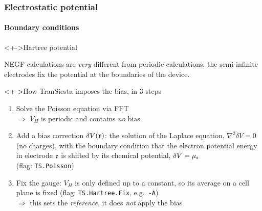 \begin{frame}
{\begin{center}

  \end{center}}

\end{frame}


\begin{frame}
  \frametitle{Electrostatic potential}
  \framesubtitle{Boundary conditions}

  \begin{block}<+->{Hartree potential}

    NEGF calculations are \emph{very} different from periodic calculations: the
    semi-infinite electrodes fix the potential at the boundaries of the device.

  \end{block}

  \begin{block}<+->{How TranSiesta imposes the bias, in 3 steps}

    \begin{enumerate}[<+->]
      \item Solve the Poisson equation via FFT\\
      $\Rightarrow$ $V_H$ is periodic and contains \emph{no} bias

      \item Add a bias correction $\delta V(\mathbf{r})$: the solution of the Laplace equation,
      $\nabla^2\delta V=0$ (no charges), with the boundary condition that the electron
      potential energy in electrode $\mathfrak{e}$ is shifted by its chemical potential,
      $\delta V = \mu_{\mathfrak{e}}$\\
      (flag: \texttt{TS.Poisson})

      \item Fix the gauge: $V_H$ is only defined up to a constant, so its average on a
      cell plane is fixed (flag: \texttt{TS.Hartree.Fix}, e.g.\ \texttt{-A})\\
      $\Rightarrow$ this sets the \emph{reference}, it does \emph{not} apply the bias

    \end{enumerate}

  \end{block}

\end{frame}


